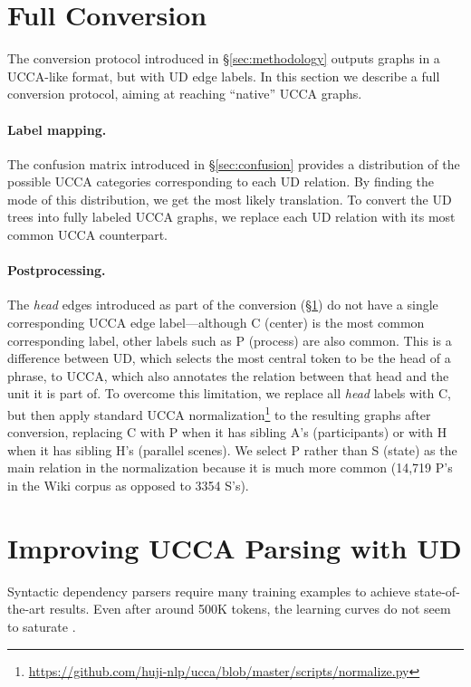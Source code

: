 \documentclass[11pt,a4paper]{article}
\begin{document}
\section{Full Conversion}\label{sec:conversion}

The conversion protocol introduced in \S\ref{sec:methodology} outputs graphs in a UCCA-like
format, but with UD edge labels.
In this section we describe a full conversion protocol,
aiming at reaching ``native'' UCCA graphs.

\paragraph{Label mapping.}
The confusion matrix introduced in \S\ref{sec:confusion}
provides a distribution of the possible UCCA categories
corresponding to each UD relation.
By finding the mode of this distribution,
we get the most likely translation.
To convert the UD trees into fully labeled UCCA graphs,
we replace each UD relation with its most common UCCA counterpart.

\paragraph{Postprocessing.}
The \textit{head} edges introduced as part of the conversion (\S\ref{sec:conversion})
do not have a single
corresponding UCCA edge label---although C (center) is the most common corresponding label,
other labels such as P (process) are also common.
This is a difference between UD, which selects the most central token to be the head of a phrase,
to UCCA, which also annotates the relation between that head and the unit it is part of.
To overcome this limitation, we replace all \textit{head} labels with C, but then
apply standard UCCA
normalization\footnote{\url{https://github.com/huji-nlp/ucca/blob/master/scripts/normalize.py}}
to the resulting graphs after conversion,
replacing C with P when it has sibling A's (participants) or
with H when it has sibling H's (parallel scenes).
We select P rather than S (state) as the main relation in the normalization because
it is much more common (14,719 P's in the Wiki corpus as opposed to 3354 S's).




\section{Improving UCCA Parsing with UD}\label{sec:silver}

Syntactic dependency parsers require many training examples to achieve
state-of-the-art results.
Even after around 500K tokens, the learning curves do not seem to saturate
\cite{de2017old,velldal2017joint}.
\end{document}
